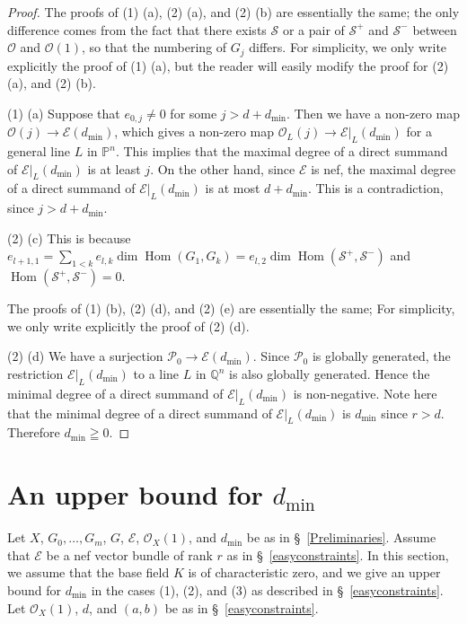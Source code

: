 \documentclass[a4paper,12pt]{amsart}
\DeclareMathOperator{\Hom}{Hom}
\begin{document}
\begin{proof}
The proofs of (1) (a), (2) (a), and (2) (b) are essentially the same; the only difference comes from the fact
that there exists $\mathcal{S}$ or a pair of $\mathcal{S}^+$ and $\mathcal{S}^-$ between $\mathcal{O}$ and $\mathcal{O}(1)$,
so that the numbering of $G_j$ differs.
For simplicity, we only write explicitly the proof of (1) (a), but the reader will easily modify the proof for (2) (a), and (2) (b).

(1) (a) Suppose that 
$e_{0,j}\neq 0$ for some $j> d+d_{\min}$.
Then we have a non-zero map $\mathcal{O}(j)\to \mathcal{E}(d_{\min})$,
which gives a non-zero map $\mathcal{O}_L(j)\to \mathcal{E}|_L(d_{\min})$
for a general line $L$ in $\mathbb{P}^n$.
This implies that the maximal degree of a direct
summand of $\mathcal{E}|_L(d_{\min})$
is at least $j$.
On the other hand, since $\mathcal{E}$ is nef, 
the maximal degree of a direct
summand of $\mathcal{E}|_L(d_{\min})$ is at most $d+d_{\min}$.
This is a contradiction, since $j> d+d_{\min}$.

(2) (c) This is because 
$e_{l+1,1}=\sum_{1<k}e_{l,k}\dim \Hom(G_1,G_k)=e_{l,2}\dim \Hom(\mathcal{S}^+,\mathcal{S}^-)$
and $\Hom(\mathcal{S}^+,\mathcal{S}^-)=0$.

The proofs of (1) (b), (2) (d), and (2) (e) are essentially the same; 
For simplicity, we only write explicitly the proof of (2) (d).

(2) (d) We have a surjection $\mathcal{P}_0\to \mathcal{E}(d_{\min})$.
Since $\mathcal{P}_0$ is globally generated,
the restriction $\mathcal{E}|_L(d_{\min})$ to a line $L$ in $\mathbb{Q}^n$ is also globally generated.
Hence the minimal degree of a direct summand of $\mathcal{E}|_L(d_{\min})$ is non-negative.
Note here that the minimal degree of a direct summand 
of $\mathcal{E}|_L(d_{\min})$ 
is $d_{\min}$
since $r>d$.
Therefore $d_{\min}\geqq 0$.
\end{proof}



\section{An upper bound for $d_{\min}$}\label{UpperBound}
Let $X$, $G_0,\dots,G_m$,
$G$,
$\mathcal{E}$, $\mathcal{O}_X(1)$, and $d_{\min}$ be as in 
\S~\ref{Preliminaries}.
Assume that $\mathcal{E}$ be a nef vector bundle of rank $r$ as in \S~\ref{easyconstraints}.
In this section, we assume that the base field $K$ is of characteristic zero,
and we give an upper bound for $d_{\min}$ in the cases (1), (2), and (3) as described in \S~\ref{easyconstraints}.
Let $\mathcal{O}_X(1)$, $d$, and $(a,b)$ be as in \S~\ref{easyconstraints}.
\end{document}
